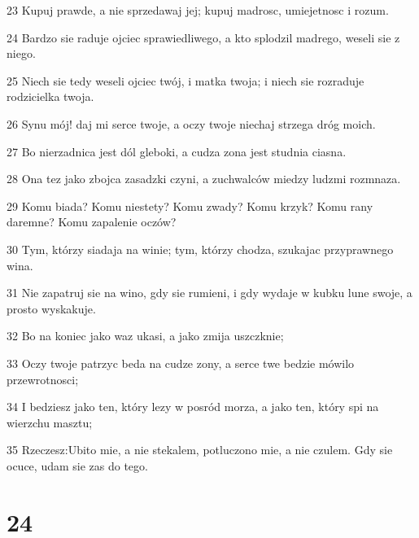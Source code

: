 \par 23 Kupuj prawde, a nie sprzedawaj jej; kupuj madrosc, umiejetnosc i rozum.
\par 24 Bardzo sie raduje ojciec sprawiedliwego, a kto splodzil madrego, weseli sie z niego.
\par 25 Niech sie tedy weseli ojciec twój, i matka twoja; i niech sie rozraduje rodzicielka twoja.
\par 26 Synu mój! daj mi serce twoje, a oczy twoje niechaj strzega dróg moich.
\par 27 Bo nierzadnica jest dól gleboki, a cudza zona jest studnia ciasna.
\par 28 Ona tez jako zbojca zasadzki czyni, a zuchwalców miedzy ludzmi rozmnaza.
\par 29 Komu biada? Komu niestety? Komu zwady? Komu krzyk? Komu rany daremne? Komu zapalenie oczów?
\par 30 Tym, którzy siadaja na winie; tym, którzy chodza, szukajac przyprawnego wina.
\par 31 Nie zapatruj sie na wino, gdy sie rumieni, i gdy wydaje w kubku lune swoje, a prosto wyskakuje.
\par 32 Bo na koniec jako waz ukasi, a jako zmija uszczknie;
\par 33 Oczy twoje patrzyc beda na cudze zony, a serce twe bedzie mówilo przewrotnosci;
\par 34 I bedziesz jako ten, który lezy w posród morza, a jako ten, który spi na wierzchu masztu;
\par 35 Rzeczesz:Ubito mie, a nie stekalem, potluczono mie, a nie czulem. Gdy sie ocuce, udam sie zas do tego.

\chapter{24}

